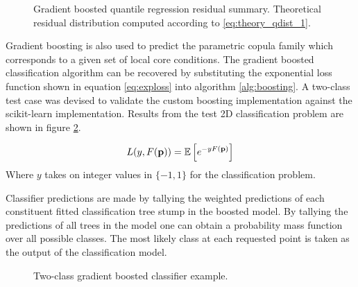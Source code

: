 \begin{figure}[H]%
    \centering
    \qquad
    \qquad
    \qquad
    \qquad
    \caption[Gradient boosted quantile regression residual summary.]{Gradient boosted quantile regression residual summary.  Theoretical residual distribution computed according to \ref{eq:theory_qdist_1}.} %
    \label{fig:gb2}%
\end{figure}

Gradient boosting is also used to predict the parametric copula family which corresponds to a given set of local core conditions.  The gradient boosted classification algorithm can be recovered by substituting the exponential loss function shown in equation \ref{eq:exploss} into algorithm \ref{alg:boosting}.   A two-class test case was devised to validate the custom boosting implementation against the scikit-learn implementation.  Results from the test 2D classification problem are shown in figure \ref{fig:gb3}.  

\begin{equation}
L(y, F(\mathbf p)) = \operatorname*{\mathbb{E}} \left[ e^{-yF(\mathbf p)}\right] 
\label{eq:exploss}
\end{equation} 
Where $y$ takes on integer values in $\{-1, 1\}$ for the classification problem.

Classifier predictions are made by tallying the weighted predictions of each constituent fitted classification tree stump in the boosted model.  By tallying the predictions of all trees in the model one can obtain a probability mass function over all possible classes.  The most likely class at each requested point is taken as the output of the classification model.

\begin{figure}[H]%
    \centering
    \qquad
    \caption[]{Two-class gradient boosted classifier example.}%
    \label{fig:gb3}%
\end{figure}

